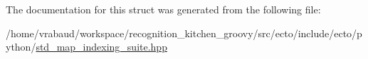 \-The documentation for this struct was generated from the following file\-:\begin{DoxyCompactItemize}
\item 
/home/vrabaud/workspace/recognition\-\_\-kitchen\-\_\-groovy/src/ecto/include/ecto/python/\hyperlink{std__map__indexing__suite_8hpp}{std\-\_\-map\-\_\-indexing\-\_\-suite.\-hpp}\end{DoxyCompactItemize}

